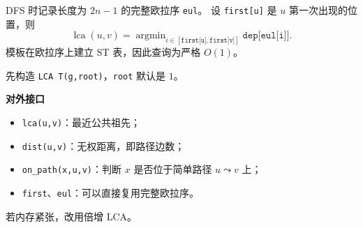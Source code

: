 DFS 时记录长度为 $2n-1$ 的完整欧拉序 \texttt{eul}。
设 \texttt{first[u]} 是 $u$ 第一次出现的位置，则
\[
  \operatorname{lca}(u,v)
  =\mathop{\arg\min}_{i\in[\texttt{first[u]},\texttt{first[v]}]}
  \texttt{dep[eul[i]]}.
\]
模板在欧拉序上建立 ST 表，因此查询为严格 $O(1)$。

先构造 \texttt{LCA T(g,root)}，\texttt{root} 默认是 $1$。

\textbf{对外接口}

\begin{itemize}
  \item \texttt{lca(u,v)}：最近公共祖先；
  \item \texttt{dist(u,v)}：无权距离，即路径边数；
  \item \texttt{on\_path(x,u,v)}：判断 $x$ 是否位于简单路径 $u\leadsto v$ 上；
  \item \texttt{first}、\texttt{eul}：可以直接复用完整欧拉序。
\end{itemize}

若内存紧张，改用倍增 LCA。
